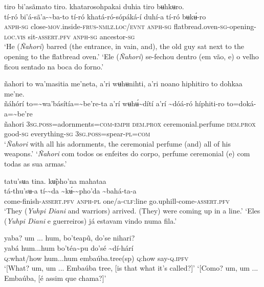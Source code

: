 \documentclass[output=paper,
modfonts,nonflat
]{langsci/langscibook}
\begin{document}
\ea tiro bi'asãmato tiro. khatarosohpakai duhia tiro bʉhkʉro.\\[.3em]
\gll tí-ró	bi'á-sã'a-{\textasciitilde}ba-to	tí-ró khatá-ró-sópáká-í	duhí-a	tí-ró	bʉkʉ́-ro\\
     \textsc{anph-sg}	close-\textsc{mov.}inside-\textsc{frus-nmlz.loc/evnt}	\textsc{anph-sg} flatbread.oven\textsc{-sg}-opening-\textsc{loc.vis} 	sit-\textsc{assert.pfv} 	\textsc{anph-sg} 	ancestor\textsc{-sg}\\
\glt ‘He (\textit{Ñahori}) barred (the entrance, in vain, and), the old guy sat next to the opening to the flatbread oven.’
\glt ‘Ele (\textit{Ñahori}) se-fechou dentro (em vão, e) o velho ficou sentado na boca do forno.’
\z 
 
\ea ñahori to wa'masitia me'neta, a’ri wʉhʉnihti, a’ri noano hiphitiro to dohkaa me'ne.\\[.3em]
\gll ñáhórí	to={\textasciitilde}wa'básítía={\textasciitilde}be're{\footnotemark}-ta a’rí	wʉhʉ́{\textasciitilde}dítí	a’rí	{\textasciitilde}dóá-ró	híphiti-ro	to=doká-a={\textasciitilde}be're\\
     ñahori	3\textsc{sg.poss}=adornments=\textsc{com-emph} \textsc{dem.prox}	ceremonial.perfume	\textsc{dem.prox}	good\textsc{-sg}	everything\textsc{-sg}	3\textsc{sg.poss}=spear-\textsc{pl=com}\\
\glt ‘\textit{Ñahori} with all his adornments, the ceremonial perfume (and) all of his weapons.’
\glt ‘\textit{Ñahori} com todos os enfeites do corpo, perfume ceremonial (e) com todas as sua armas.’
\z 

\ea tatu'sʉa tina. kʉ̃pho'na mahataa \\[.3em]
\gll tá-thu'sʉ-a	tí-{\textasciitilde}da	{\textasciitilde}kʉ́-{\textasciitilde}pho'da	{\textasciitilde}bahá-ta-a\\
     come-finish-\textsc{assert.pfv} \textsc{anph-pl}	one/a-\textsc{clf:}line	go.uphill-come-\textsc{assert.pfv}\\
\glt ‘They (\textit{Yuhpi Diani} and warriors) arrived. (They) were coming up in a line.’
\glt ‘Eles (\textit{Yuhpi Diani} e guerreiros) já estavam vindo numa fila.’
\z

\ea yaba? um ... hum, bo'teapũ, do'se nihari?\\[.3em]
\gll yabá{\footnotemark}	hum...hum	bo'téa{\textasciitilde}pu	do'sé	{\textasciitilde}dí-hárí\\
     \textsc{q:}what/how	hum...hum	embaúba.tree(sp)	\textsc{q:}how	say-\textsc{q.ipfv}\\
\glt ‘[What? um, um ... Embaúba tree, [is that what it's called?]’ 
\glt ‘[Como? um, um ... Embaúba, [é assim que chama?]’ 
\z
\end{document}
